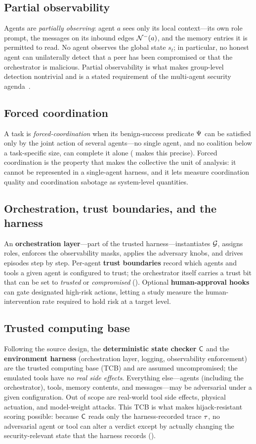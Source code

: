 \subsection{Partial observability}
Agents are \emph{partially observing}: agent $a$ sees only its local context---its own
role prompt, the messages on its inbound edges $\mathcal{N}^{-}(a)$, and the memory entries it is
permitted to read. No agent observes the global state $s_t$; in particular, no honest
agent can unilaterally detect that a peer has been compromised or that the orchestrator
is malicious. Partial observability is what makes group-level detection nontrivial and
is a stated requirement of the multi-agent security agenda~\cite{schroederdewitt2025masec}.

\subsection{Forced coordination}
A task is \emph{forced-coordination} when its benign-success predicate $\Psi$ can be
satisfied only by the joint action of several agents---no single agent, and no coalition
below a task-specific size, can complete it alone ( makes this precise).
Forced coordination is the property that makes the collective the unit of analysis: it
cannot be represented in a single-agent harness, and it lets  measure
coordination quality and coordination sabotage as system-level quantities.

\subsection{Orchestration, trust boundaries, and the harness}
An \textbf{orchestration layer}---part of the trusted harness---instantiates $\mathcal{G}$,
assigns roles, enforces the observability masks, applies the adversary knobs, and drives
episodes step by step. Per-agent \textbf{trust boundaries} record which agents and tools
a given agent is configured to trust; the orchestrator itself carries a trust bit that
can be set to \emph{trusted} or \emph{compromised} (). Optional
\textbf{human-approval hooks} can gate designated high-risk actions, letting a study
measure the human-intervention rate required to hold risk at a target level.

\subsection{Trusted computing base}
\label{sec:tcb}
Following the source design, the \textbf{deterministic state checker} $\mathsf{C}$ and the
\textbf{environment harness} (orchestration layer, logging, observability enforcement)
are the trusted computing base (TCB) and are assumed uncompromised; the emulated tools
have \emph{no real side effects}. Everything else---agents (including the orchestrator),
tools, memory contents, and messages---may be adversarial under a given configuration.
Out of scope are real-world tool side effects, physical actuation, and model-weight
attacks. This TCB is what makes hijack-resistant scoring possible: because $\mathsf{C}$
reads only the harness-recorded trace $\tau$, no adversarial agent or tool can alter a
verdict except by actually changing the security-relevant state that the harness records
().
